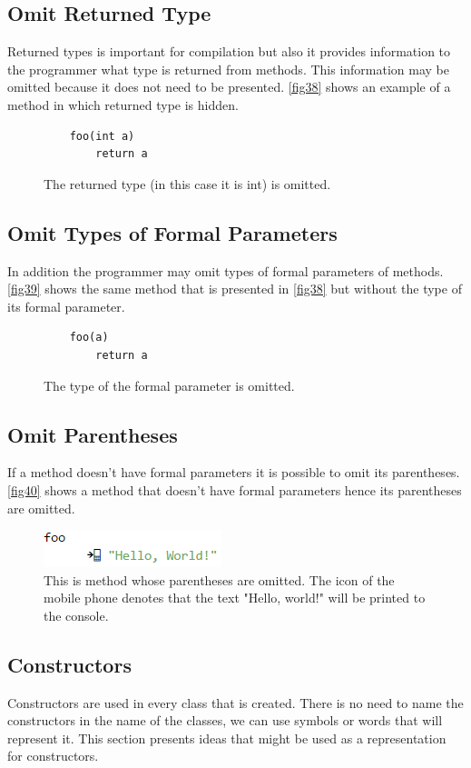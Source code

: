 \subsection{Omit Returned Type}
Returned types is important for compilation but also it provides information to the programmer what type is returned from methods. This information may be omitted because it does not need to be presented. \autoref{fig38} shows an example of a method in which returned type is hidden.
\begin{figure}[H]
	\begin{lstlisting}
	foo(int a)
		return a
	\end{lstlisting}
	\caption{The returned type (in this case it is int) is omitted.}
	\label{fig38}
\end{figure}
\subsection{Omit Types of Formal Parameters}
In addition the programmer may omit types of formal parameters of methods. \autoref{fig39} shows the same method that is presented in \autoref{fig38} but without the type of its formal parameter.
\begin{figure}[H]
	\begin{lstlisting}
	foo(a)
		return a
	\end{lstlisting}
	\caption{The type of the formal parameter is omitted.}
	\label{fig39}
\end{figure}
\subsection{Omit Parentheses}
If a method doesn't have formal parameters it is possible to omit its parentheses. \autoref{fig40} shows a method that doesn't have formal parameters hence its parentheses are omitted.
\begin{figure}[H]
	\includegraphics{"./fig/foo with omitted parentheses"}
	\caption{This is method whose parentheses are omitted. The icon of the mobile phone denotes that the text "Hello, world!" will be printed to the console.}
	\label{fig40}
\end{figure}
\subsection{Constructors}
Constructors are used in every class that is created. There is no need to name the constructors in the name of the classes, we can use symbols or words that will represent it. This section presents ideas that might be used as a representation for constructors.

